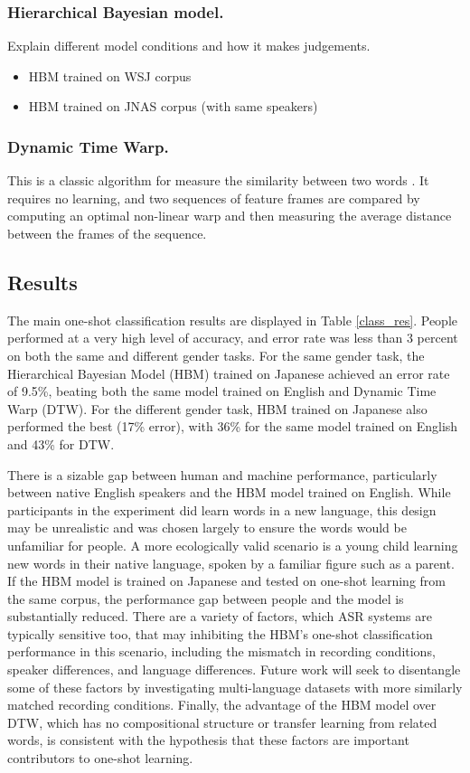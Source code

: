 \documentclass[10pt,letterpaper]{article}
\begin{document}
\subsubsection{Hierarchical Bayesian model.}

Explain different model conditions and how it makes judgements.
\begin{itemize}
	\item HBM trained on WSJ corpus
	\item HBM trained on JNAS corpus (with same speakers)
\end{itemize}

\subsubsection{Dynamic Time Warp.} 
This is a classic algorithm for measure the similarity between two words \cite{Sakoe1978}. It requires no learning, and two sequences of feature frames are compared by computing an optimal non-linear warp and then measuring the average distance between the frames of the sequence. 

\subsection{Results}
The main one-shot classification results are displayed in Table \ref{class_res}. People performed at a very high level of accuracy, and error rate was less than 3 percent on both the same and different gender tasks. For the same gender task, the Hierarchical Bayesian Model (HBM) trained on Japanese achieved an error rate of 9.5\%, beating both the same model trained on English and Dynamic Time Warp (DTW). For the different gender task, HBM trained on Japanese also performed the best (17\% error), with 36\% for the same model trained on English and 43\% for DTW. 

There is a sizable gap between human and machine performance, particularly between native English speakers and the HBM model trained on English. While participants in the experiment did learn words in a new language, this design may be unrealistic and was chosen largely to ensure the words would be unfamiliar for people. A more ecologically valid scenario is a young child learning new words in their native language, spoken by a familiar figure such as a parent. If the HBM model is trained on Japanese and tested on one-shot learning from the same corpus, the performance gap between people and the model is substantially reduced. There are a variety of factors, which ASR systems are typically sensitive too, that may inhibiting the HBM's one-shot classification performance in this scenario, including the mismatch in recording conditions, speaker differences, and language differences. Future work will seek to disentangle some of these factors by investigating multi-language datasets with more similarly matched recording conditions. Finally, the advantage of the HBM model over DTW, which has no compositional structure or transfer learning from related words, is consistent with the hypothesis that these factors are important contributors to one-shot learning. 
\end{document}
